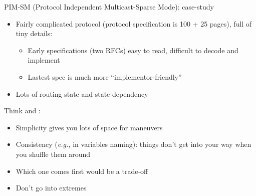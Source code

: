 \documentclass[landscape]{icsislides}
\newcommand{\eg}{\emph{e.g.,}\xspace}
\begin{document}
\begin{slide}

PIM-SM (Protocol Independent Multicast-Sparse Mode): case-study

\begin{itemize}

  \item Fairly complicated protocol (protocol specification is 100 + 25
  pages), full of tiny details:
  \begin{itemize}
    \item Early specifications (two RFCs) easy to read, difficult to decode and
    implement
    \item Lastest spec is much more ``implementor-friendly''
  \end{itemize}

  \item Lots of routing state and state dependency

\end{itemize}

\end{slide}

\begin{slide}

Think  and :

\begin{itemize}

  \item Simplicity gives you lots of space for maneuvers

  \item Consistency (\eg in variables naming): things don't get into your way
  when you shuffle them around

  \item Which one comes first would be a trade-off

  \item Don't go into extremes

\end{itemize}

\end{slide}
\end{document}
